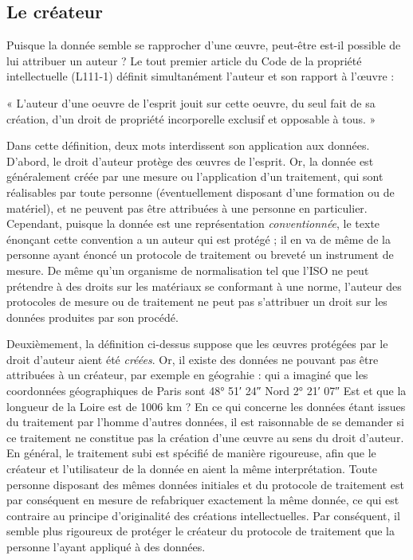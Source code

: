 \subsection{Le créateur}

Puisque la donnée semble se rapprocher d'une œuvre, peut-être est-il
possible de lui attribuer un auteur ? Le tout premier article du Code
de la propriété intellectuelle (L111-1) définit simultanément l'auteur
et son rapport à l'œuvre :

« L'auteur d'une oeuvre de l'esprit jouit sur cette oeuvre, du seul
fait de sa création, d'un droit de propriété incorporelle exclusif et
opposable à tous. »

Dans cette définition, deux mots interdissent son application aux
données.  D'abord, le droit d'auteur protège des œuvres de
l'esprit. Or, la donnée est généralement créée par une mesure ou
l'application d'un traitement, qui sont réalisables par toute personne
(éventuellement disposant d'une formation ou de matériel), et ne
peuvent pas être attribuées à une personne en particulier. Cependant,
puisque la donnée est une représentation \emph{conventionnée}, le
texte énonçant cette convention a un auteur qui est protégé ; il en va
de même de la personne ayant énoncé un protocole de traitement ou
breveté un instrument de mesure. De même qu'un organisme de
normalisation tel que l'ISO ne peut prétendre à des droits sur les
matériaux se conformant à une norme, l'auteur des protocoles de mesure
ou de traitement ne peut pas s'attribuer un droit sur les données
produites par son procédé.

Deuxièmement, la définition ci-dessus suppose que les œuvres protégées
par le droit d'auteur aient été \emph{créées}. Or, il existe des
données ne pouvant pas être attribuées à un créateur, par exemple en
géograhie : qui a imaginé que les coordonnées géographiques de Paris
sont 48° 51′ 24″ Nord 2° 21′ 07″ Est et que la longueur de la Loire
est de 1006 km ? En ce qui concerne les données étant issues du
traitement par l'homme d'autres données, il est raisonnable de se
demander si ce traitement ne constitue pas la création d'une œuvre au
sens du droit d'auteur. En général, le traitement subi est spécifié de
manière rigoureuse, afin que le créateur et l'utilisateur de la donnée
en aient la même interprétation. Toute personne disposant des mêmes
données initiales et du protocole de traitement est par conséquent en
mesure de refabriquer exactement la même donnée, ce qui est contraire
au principe d'originalité des créations intellectuelles. Par
conséquent, il semble plus rigoureux de protéger le créateur du
protocole de traitement que la personne l'ayant appliqué à des
données.

